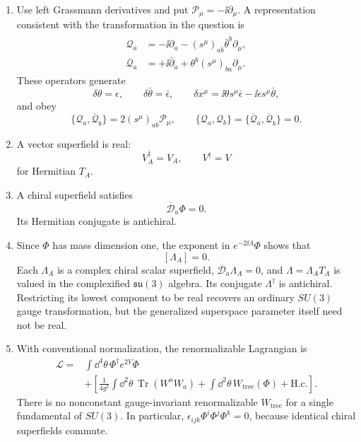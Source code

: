 \begin{enumerate}
  \begin{enumerate}
    \item[(i)] Use left Grassmann derivatives and put
      \(\mathcal P_\mu=-\ii\partial_\mu\).  A representation consistent with
      the transformation in the question is
      \[
      \begin{aligned}
        \mathcal Q_a
          &=-\ii\partial_a
            -(s^\mu)_{a\dot b}\bar\theta^{\dot b}\partial_\mu,\\
        \overline{\mathcal Q}_{\dot a}
          &=+\ii\bar\partial_{\dot a}
            +\theta^b(s^\mu)_{b\dot a}\partial_\mu .
      \end{aligned}
      \]
      These operators generate
      \[
        \delta\theta=\epsilon,\qquad
        \delta\bar\theta=\bar\epsilon,\qquad
        \delta x^\mu
          =\ii\theta s^\mu\bar\epsilon
             -\ii\epsilon s^\mu\bar\theta,
      \]
      and obey
      \[
        \{\mathcal Q_a,\overline{\mathcal Q}_{\dot b}\}
          =2(s^\mu)_{a\dot b}\mathcal P_\mu,\qquad
        \{\mathcal Q_a,\mathcal Q_b\}
          =\{\overline{\mathcal Q}_{\dot a},
              \overline{\mathcal Q}_{\dot b}\}=0.
      \]

    \item[(ii)] A vector superfield is real:
      \[
        V_A^\dagger=V_A,\qquad V^\dagger=V
      \]
      for Hermitian \(T_A\).

    \item[(iii)] A chiral superfield satisfies
      \[
        \overline{\mathcal D}_{\dot a}\Phi=0.
      \]
      Its Hermitian conjugate is antichiral.

    \item[(iv)] Since \(\Phi\) has mass dimension one, the exponent in
      \(e^{-2\ii\Lambda}\Phi\) shows that
      \[
        [\Lambda_A]=0.
      \]
      Each \(\Lambda_A\) is a complex chiral scalar superfield,
      \(\overline{\mathcal D}_{\dot a}\Lambda_A=0\), and
      \(\Lambda=\Lambda_AT_A\) is valued in the complexified
      \(\mathfrak{su}(3)\) algebra.  Its conjugate
      \(\Lambda^\dagger\) is antichiral.  Restricting its lowest component
      to be real recovers an ordinary \(SU(3)\) gauge transformation, but
      the generalized superspace parameter itself need not be real.

    \item[(v)] With conventional normalization, the renormalizable
      Lagrangian is
      \[
      \begin{aligned}
        \mathcal L={}&
          \int \dd^4\theta\,\Phi^\dagger e^{2V}\Phi\\
        &+\left[
          \frac1{4g^2}\int \dd^2\theta\,
             \operatorname{Tr}(W^aW_a)
          +\int \dd^2\theta\,W_{\mathrm{tree}}(\Phi)
          +\mathrm{H.c.}\right].
      \end{aligned}
      \]
      There is no nonconstant gauge-invariant renormalizable
      \(W_{\mathrm{tree}}\) for a single fundamental of \(SU(3)\).
      In particular,
      \(\epsilon_{ijk}\Phi^i\Phi^j\Phi^k=0\), because identical chiral
      superfields commute.


\end{enumerate}
\end{enumerate}
